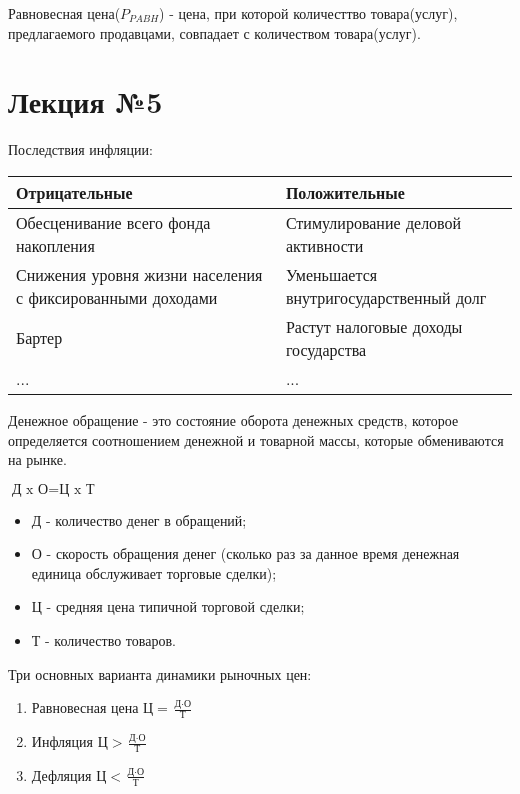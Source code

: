\documentclass[a4paper, 12pt]{article}
\begin{document}
	Равновесная цена($P_{PABH}$) - цена, при которой количесттво товара(услуг), предлагаемого продавцами, совпадает с количеством товара(услуг).
	
	\part*{Лекция №5}
	
	Последствия инфляции:
	\begin{center}
		\begin{tabular}{ | m{10em} | m{10em} | }
			\hline
			Отрицательные & Положительные \\
			\hline
			Обесценивание всего фонда накопления & Стимулирование деловой активности \\
			\hline
			Снижения уровня жизни населения с фиксированными доходами & Уменьшается внутригосударственный долг \\
			\hline
			Бартер & Растут налоговые доходы государства \\
			\hline
			... & ... \\
			\hline
		\end{tabular}
	\end{center}

	Денежное обращение - это состояние оборота денежных средств, которое определяется соотношением денежной и товарной массы, которые обмениваются на рынке.
	
	$\text{Д x О} = \text{Ц x Т}$
	
	\begin{itemize}
		\item Д - количество денег в обращений;
		\item О - скорость обращения денег (сколько раз за данное время денежная единица обслуживает торговые сделки);
		\item Ц - средняя цена типичной торговой сделки;
		\item Т - количество товаров.
	\end{itemize}


	Три основных варианта динамики рыночных цен:
	\begin{enumerate}
		\item Равновесная цена $\text{Ц} = \frac{\text{Д} \cdot \text{О}}{\text{Т}}$
		\item Инфляция $\text{Ц} > \frac{\text{Д} \cdot \text{О}}{\text{Т}}$
		\item Дефляция $\text{Ц} < \frac{\text{Д} \cdot \text{О}}{\text{Т}}$
	\end{enumerate}
\end{document}

